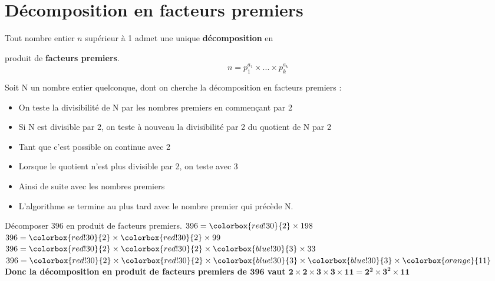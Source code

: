 \section{Décomposition en facteurs premiers}

\begin{propriete}[\admise]
Tout nombre entier $n$ supérieur à 1 admet une unique \textbf{décomposition} en 

produit de \textbf{facteurs premiers}.
$$n=p_1^{a_1}\times...\times p_k^{a_k}$$
\end{propriete}

\begin{methode}
    Soit N un nombre entier quelconque, dont on cherche la décomposition en facteurs premiers :
    \begin{itemize}
        \item On teste la divisibilité de N par les nombres premiers en commençant par 2
        \item Si N est divisible par 2, on teste à nouveau la divisibilité par 2 du quotient de N par 2
        \item Tant que c'est possible on continue avec 2
        \item Lorsque le quotient n'est plus divisible par 2, on teste avec 3
        \item Ainsi de suite avec les nombres premiers 
        \item L'algorithme se termine au plus tard avec le nombre premier qui précède N.
    \end{itemize}
    \exercice
    Décomposer $396$ en produit de facteurs premiers.
    \correction
    $396 = \colorbox{red!30}{2} \times  198$\\
    $396 = \colorbox{red!30}{2} \times  \colorbox{red!30}{2} \times  99$\\
    $396 = \colorbox{red!30}{2} \times  \colorbox{red!30}{2} \times  \colorbox{blue!30}{3} \times  33$\\
    $396 = \colorbox{red!30}{2} \times  \colorbox{red!30}{2} \times  \colorbox{blue!30}{3} \times  \colorbox{blue!30}{3} \times  \colorbox{orange}{11}$\\
    {\bfseries Donc la décomposition en produit de facteurs premiers de $\mathbf{396}$ vaut $\mathbf{2 \times  2 \times  3 \times  3 \times  11 = 2^2\times 3^2\times 11}$}

\end{methode}

